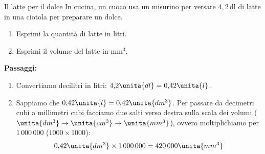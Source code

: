 \begin{esercizio}{Il latte per il dolce}
In cucina, un cuoco usa un misurino per versare $4{,}2\,\mathrm{dl}$ di latte in una ciotola per preparare un dolce.

\begin{enumerate}[label=\alph*)]
  \item Esprimi la quantità di latte in litri.
  \item Esprimi il volume del latte in $\mathrm{mm^3}$.
\end{enumerate}

\responsespace{10cm}

\begin{soluzione}
  \textbf{Passaggi:}
  \begin{enumerate}[label=\alph*)]
    \item Convertiamo decilitri in litri: $4{,}2\unita{dl} = 0{,}42\unita{l}$.
    \item Sappiamo che $0{,}42\unita{l} = 0{,}42\unita{dm^3}$. Per passare da decimetri cubi a millimetri cubi facciamo due salti verso destra sulla scala dei volumi ($\unita{dm^3} \to \unita{cm^3} \to \unita{mm^3}$), ovvero moltiplichiamo per $1\,000\,000$ ($1000 \times 1000$):
    \[
    0{,}42\unita{dm^3} \times 1\,000\,000 = 420\,000\unita{mm^3}
    \]
  \end{enumerate}
\end{soluzione}
\end{esercizio}

